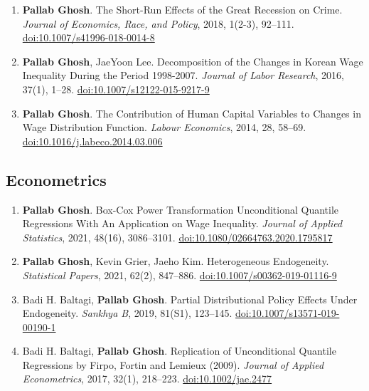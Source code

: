 \documentclass[10.5pt]{article}
\begin{document}
\begin{enumerate}
\item \textbf{Pallab Ghosh}. The Short-Run Effects of the Great Recession on Crime. \emph{Journal of Economics, Race, and Policy}, 2018, 1(2-3), 92--111. \href{https://doi.org/10.1007/s41996-018-0014-8}{doi:10.1007/s41996-018-0014-8}
\item \textbf{Pallab Ghosh}, JaeYoon Lee. Decomposition of the Changes in Korean Wage Inequality During the Period 1998-2007. \emph{Journal of Labor Research}, 2016, 37(1), 1--28. \href{https://doi.org/10.1007/s12122-015-9217-9}{doi:10.1007/s12122-015-9217-9}
\item \textbf{Pallab Ghosh}. The Contribution of Human Capital Variables to Changes in Wage Distribution Function. \emph{Labour Economics}, 2014, 28, 58--69. \href{https://doi.org/10.1016/j.labeco.2014.03.006}{doi:10.1016/j.labeco.2014.03.006}
\end{enumerate}
\subsection{Econometrics}
\begin{enumerate}
\item \textbf{Pallab Ghosh}. Box-Cox Power Transformation Unconditional Quantile Regressions With An Application on Wage Inequality. \emph{Journal of Applied Statistics}, 2021, 48(16), 3086--3101. \href{https://doi.org/10.1080/02664763.2020.1795817}{doi:10.1080/02664763.2020.1795817}
\item \textbf{Pallab Ghosh}, Kevin Grier, Jaeho Kim. Heterogeneous Endogeneity. \emph{Statistical Papers}, 2021, 62(2), 847--886. \href{https://doi.org/10.1007/s00362-019-01116-9}{doi:10.1007/s00362-019-01116-9}
\item Badi H. Baltagi, \textbf{Pallab Ghosh}. Partial Distributional Policy Effects Under Endogeneity. \emph{Sankhya B}, 2019, 81(S1), 123--145. \href{https://doi.org/10.1007/s13571-019-00190-1}{doi:10.1007/s13571-019-00190-1}
\item Badi H. Baltagi, \textbf{Pallab Ghosh}. Replication of Unconditional Quantile Regressions by Firpo, Fortin and Lemieux (2009). \emph{Journal of Applied Econometrics}, 2017, 32(1), 218--223. \href{https://doi.org/10.1002/jae.2477}{doi:10.1002/jae.2477}
\end{enumerate}
\end{document}
